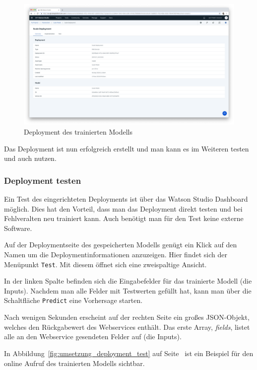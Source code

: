 \begin{figure}[h]
    \centering
    \includegraphics[width=\textwidth]{images/kapitel_3/umsetzung_deployment_model.png}
    \caption{Deployment des trainierten Modells}
    \label{fig:umsetzung_deployment}
\end{figure}

Das Deployment ist nun erfolgreich erstellt und man kann es im Weiteren testen und auch nutzen.

\subsubsection{Deployment testen}
Ein Test des eingerichteten Deployments ist über das Watson Studio Dashboard möglich. Dies hat den Vorteil, dass man das
Deployment direkt testen und bei Fehlveralten neu trainiert kann. Auch benötigt man für den Test keine externe Software.

Auf der Deploymentseite des gespeicherten Modells genügt ein Klick auf den Namen um die Deploymentinformationen
anzuzeigen. Hier findet sich der Menüpunkt \texttt{Test}. Mit diesem öffnet sich eine zweispaltige Ansicht.

In der linken Spalte befinden sich die Eingabefelder für das trainierte Modell (die Inputs). Nachdem man alle Felder mit
Testwerten gefüllt hat, kann man über die Schaltfläche \texttt{Predict} eine Vorhersage starten.

Nach wenigen Sekunden erscheint auf der rechten Seite ein großes JSON-Objekt, welches den Rückgabewert des Webservices
enthält. Das erste Array, \textit{fields}, listet alle an den Webservice gesendeten Felder auf (die Inputs).

In Abbildung~\ref{fig:umsetzung_deployment_test} auf Seite~\pageref{fig:umsetzung_deployment_test} ist ein Beispiel für
den online Aufruf des trainierten Modells sichtbar.

